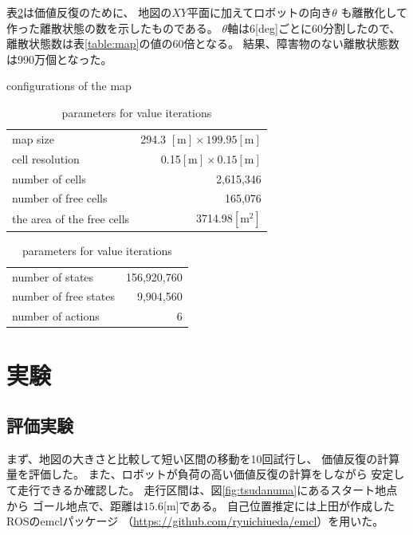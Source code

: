 \documentclass{jarticle}
\begin{document}
表\ref{table:cells}は価値反復のために、
地図の$XY$平面に加えてロボットの向き$\theta$
も離散化して作った離散状態の数を示したものである。
$\theta$軸は6[deg]ごとに60分割したので、
離散状態数は表\ref{table:map}の値の60倍となる。
結果、障害物のない離散状態数は990万個となった。

\begin{table}[bth]
  \caption{conﬁgurations of the map}
	\label{table:map}
  \centering
	\begin{small}
  \begin{tabular}{l|r}
    \hline
    map size & 294.3 $\mathrm{[m]}\times 199.95\mathrm{[m]}$\\
    cell resolution &  0.15$\mathrm{[m]}\times 0.15\mathrm{[m]}$ \\
		number of cells & 2,615,346\\
    number of free cells & 165,076\\
		the area of the free cells & 3714.98$\mathrm{[m^2]}$\\
    \hline
  \end{tabular}
	\end{small}
	\caption{parameters for value iterations}
	\label{table:cells}
  \centering
  \begin{tabular}{l|r}
    \hline
    number of states & 156,920,760\\
    number of free states &  9,904,560\\
		number of actions & 6\\
    \hline
  \end{tabular}
\end{table}

\section{実験}%

\subsection{評価実験}
まず、地図の大きさと比較して短い区間の移動を10回試行し、
価値反復の計算量を評価した。
また、ロボットが負荷の高い価値反復の計算をしながら
安定して走行できるか確認した。
走行区間は、図\ref{fig:tsudanuma}にあるスタート地点から
ゴール地点で、距離は$15.6$[m]である。
自己位置推定には上田が作成したROSのemclパッケージ
（\url{https://github.com/ryuichiueda/emcl}）を用いた。
\end{document}

